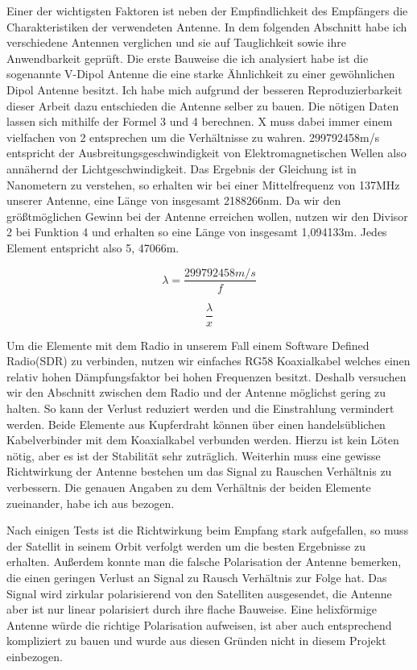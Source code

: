 \begin{multicols*}{2}
    Einer der wichtigsten Faktoren ist neben der Empfindlichkeit des Empfängers die Charakteristiken der verwendeten Antenne. In dem folgenden Abschnitt habe ich verschiedene Antennen verglichen und sie auf Tauglichkeit sowie ihre Anwendbarkeit geprüft. Die erste Bauweise die ich analysiert habe ist die sogenannte V-Dipol Antenne die eine starke Ähnlichkeit zu einer gewöhnlichen Dipol Antenne besitzt. Ich habe mich aufgrund der besseren Reproduzierbarkeit dieser Arbeit dazu entschieden die Antenne selber zu bauen. Die nötigen Daten lassen sich mithilfe der Formel 3 und 4 berechnen. X muss dabei immer einem vielfachen von 2 entsprechen um die Verhältnisse zu wahren. 299792458m/s entspricht der Ausbreitungsgeschwindigkeit von Elektromagnetischen Wellen also annähernd der Lichtgeschwindigkeit. Das Ergebnis der Gleichung ist in Nanometern zu verstehen, so erhalten wir bei einer Mittelfrequenz von 137MHz unserer Antenne, eine Länge von insgesamt 2188266nm. Da wir den größtmöglichen Gewinn bei der Antenne erreichen wollen, nutzen wir den Divisor 2 bei Funktion 4 und erhalten so eine Länge von insgesamt 1,094133m. Jedes Element entspricht also 5,
    47066m.
    \newpage
    

    \begin{equation}
        \lambda = \frac{299792458 m/s}{f}  
    \end{equation}


    \begin{equation}
        \frac{\lambda}{x}  
    \end{equation}

    Um die Elemente mit dem Radio in unserem Fall einem Software Defined Radio(SDR) zu verbinden, nutzen wir einfaches RG58 Koaxialkabel welches einen relativ hohen Dämpfungsfaktor bei hohen Frequenzen besitzt. Deshalb versuchen wir den Abschnitt zwischen dem Radio und der Antenne möglichst gering zu halten. So kann der Verlust reduziert werden und die Einstrahlung vermindert werden. Beide Elemente aus Kupferdraht können über einen handelsüblichen Kabelverbinder mit dem Koaxialkabel verbunden werden. Hierzu ist kein Löten nötig, aber es ist der Stabilität sehr zuträglich. Weiterhin muss eine gewisse Richtwirkung der Antenne bestehen um das Signal zu Rauschen Verhältnis zu verbessern. Die genauen Angaben zu dem Verhältnis der beiden Elemente zueinander, habe ich aus \cite[]{Diy137MHz} bezogen. 

    Nach einigen Tests ist die Richtwirkung beim Empfang stark aufgefallen, so muss der Satellit in seinem Orbit verfolgt werden um die besten Ergebnisse zu erhalten. Außerdem konnte man die falsche Polarisation der Antenne bemerken, die einen geringen Verlust an Signal zu Rausch Verhältnis zur Folge hat. Das Signal wird zirkular polarisierend von den Satelliten ausgesendet, die Antenne aber ist nur linear polarisiert durch ihre flache Bauweise. Eine helixförmige Antenne würde die richtige Polarisation aufweisen, ist aber auch entsprechend kompliziert zu bauen und wurde aus diesen Gründen nicht in diesem Projekt einbezogen. 


\end{multicols*}
